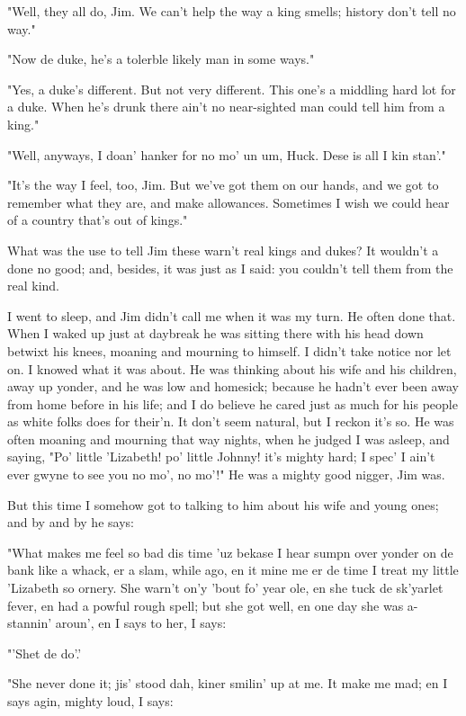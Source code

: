 "Well, they all do, Jim.  We can't help the way a king smells; history
don't tell no way."

"Now de duke, he's a tolerble likely man in some ways."

"Yes, a duke's different.  But not very different.  This one's a middling
hard lot for a duke.  When he's drunk there ain't no near-sighted man
could tell him from a king."

"Well, anyways, I doan' hanker for no mo' un um, Huck.  Dese is all I kin
stan'."

"It's the way I feel, too, Jim.  But we've got them on our hands, and we
got to remember what they are, and make allowances.  Sometimes I wish we
could hear of a country that's out of kings."

What was the use to tell Jim these warn't real kings and dukes?  It
wouldn't a done no good; and, besides, it was just as I said:  you
couldn't tell them from the real kind.

I went to sleep, and Jim didn't call me when it was my turn.  He often
done that.  When I waked up just at daybreak he was sitting there with
his head down betwixt his knees, moaning and mourning to himself.  I
didn't take notice nor let on.  I knowed what it was about.  He was
thinking about his wife and his children, away up yonder, and he was low
and homesick; because he hadn't ever been away from home before in his
life; and I do believe he cared just as much for his people as white
folks does for their'n.  It don't seem natural, but I reckon it's so.  He
was often moaning and mourning that way nights, when he judged I was
asleep, and saying, "Po' little 'Lizabeth! po' little Johnny! it's mighty
hard; I spec' I ain't ever gwyne to see you no mo', no mo'!"  He was a
mighty good nigger, Jim was.

But this time I somehow got to talking to him about his wife and young
ones; and by and by he says:

"What makes me feel so bad dis time 'uz bekase I hear sumpn over yonder
on de bank like a whack, er a slam, while ago, en it mine me er de time I
treat my little 'Lizabeth so ornery.  She warn't on'y 'bout fo' year ole,
en she tuck de sk'yarlet fever, en had a powful rough spell; but she got
well, en one day she was a-stannin' aroun', en I says to her, I says:

"'Shet de do'.'

"She never done it; jis' stood dah, kiner smilin' up at me.  It make me
mad; en I says agin, mighty loud, I says:

